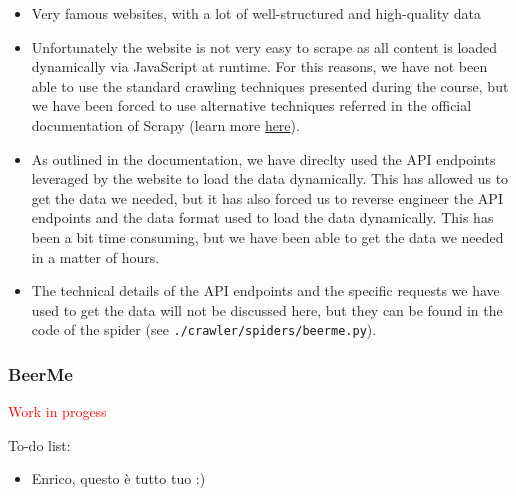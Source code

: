 \begin{itemize}
  \item Very famous websites, with a lot of well-structured and high-quality data
  \item Unfortunately the website is not very easy to scrape as all content is loaded dynamically via JavaScript at runtime. For this reasons, we have not been able to use the standard crawling techniques presented during the course, but we have been forced to use alternative techniques referred in the official documentation of Scrapy (learn more \href{https://docs.scrapy.org/en/latest/topics/dynamic-content.html}{here}).
  \item As outlined in the documentation, we have direclty used the API endpoints leveraged by the website to load the data dynamically. This has allowed us to get the data we needed, but it has also forced us to reverse engineer the API endpoints and the data format used to load the data dynamically. This has been a bit time consuming, but we have been able to get the data we needed in a matter of hours.
  \item The technical details of the API endpoints and the specific requests we have used to get the data will not be discussed here, but they can be found in the code of the spider (see \texttt{./crawler/spiders/beerme.py}).
\end{itemize}

\subsubsection{BeerMe}

\textcolor{red}{Work in progess}

To-do list:

\begin{itemize}
  \item Enrico, questo è tutto tuo :)
\end{itemize}

